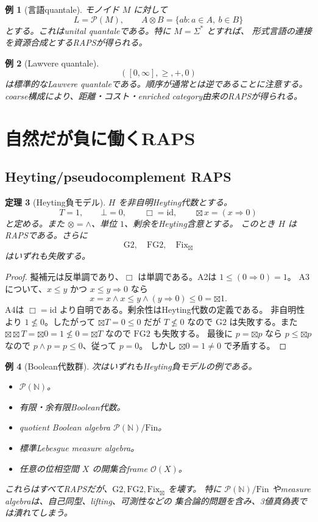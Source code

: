 \documentclass[uplatex,dvipdfmx,a4paper,10pt]{jsarticle}
\newtheorem{theorem}{定理}
\newtheorem{example}[theorem]{例}
\newcommand{\Gtwo}{\mathrm{G2}}
\newcommand{\FGtwo}{\mathrm{FG2}}
\newcommand{\Fix}{\mathrm{Fix}}
\newcommand{\bt}{\boxtimes}
\newcommand{\Pow}{\mathcal P}
\newcommand{\N}{\mathbb N}
\begin{document}
\begin{example}[言語quantale]
モノイド \(M\) に対して
\[
L=\Pow(M),\qquad A\otimes B=\{ab:a\in A,\ b\in B\}
\]
とする。これはunital quantaleである。特に \(M=\Sigma^\ast\) とすれば、
形式言語の連接を資源合成とするRAPSが得られる。
\end{example}

\begin{example}[Lawvere quantale]
\[
([0,\infty],\ge,+,0)
\]
は標準的なLawvere quantaleである。順序が通常とは逆であることに注意する。
coarse構成により、距離・コスト・enriched category由来のRAPSが得られる。
\end{example}

\section{自然だが負に働くRAPS}

\subsection{Heyting/pseudocomplement RAPS}

\begin{theorem}[Heyting負モデル]
\(H\) を非自明Heyting代数とする。
\[
T=1,\qquad \bot=0,\qquad \Box=\mathrm{id},\qquad \bt x=(x\Rightarrow0)
\]
と定める。また \(\otimes=\wedge\)、単位 \(1\)、剰余をHeyting含意とする。
このとき \(H\) はRAPSである。さらに
\[
\Gtwo,\quad \FGtwo,\quad \Fix_{\bt}
\]
はいずれも失敗する。
\end{theorem}

\begin{proof}
擬補元は反単調であり、\(\Box\) は単調である。A2は \(1\le(0\Rightarrow0)=1\)。
A3について、\(x\le y\) かつ \(x\le y\Rightarrow0\) なら
\[
x=x\wedge x\le y\wedge(y\Rightarrow0)\le0=\bt1.
\]
A4は \(\Box=\mathrm{id}\) より自明である。剰余性はHeyting代数の定義である。
非自明性より \(1\nleq0\)。したがって \(\bt T=0\le0\) だが \(T\nleq0\) なので
\(\Gtwo\) は失敗する。また \(\bt\bt T=\bt0=1\nleq0=\bt T\) なので \(\FGtwo\) も失敗する。
最後に \(p=\bt p\) なら \(p\le\bt p\) なので \(p\wedge p=p\le0\)、従って \(p=0\)。
しかし \(\bt0=1\ne0\) で矛盾する。
\end{proof}

\begin{example}[Boolean代数群]
次はいずれもHeyting負モデルの例である。
\begin{itemize}
  \item \(\Pow(\N)\)。
  \item 有限・余有限Boolean代数。
  \item quotient Boolean algebra \(\Pow(\N)/\mathrm{Fin}\)。
  \item 標準Lebesgue measure algebra。
  \item 任意の位相空間 \(X\) の開集合frame \(\mathcal O(X)\)。
\end{itemize}
これらはすべてRAPSだが、\(\Gtwo,\FGtwo,\Fix_{\bt}\) を壊す。
特に \(\Pow(\N)/\mathrm{Fin}\) やmeasure algebraは、自己同型、lifting、可測性などの
集合論的問題を含み、3値真偽表では潰れてしまう。
\end{example}
\end{document}
